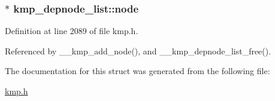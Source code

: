 \hypertarget{structkmp__depnode__list_a8873aa1231cab49fdd5ca6dc3b89eca4}{
\subsubsection[{node}]{$\ast$ kmp\-\_\-depnode\-\_\-list\-::node}}\label{structkmp__depnode__list_a8873aa1231cab49fdd5ca6dc3b89eca4}


Definition at line 2089 of file kmp.\-h.



Referenced by \-\_\-\-\_\-kmp\-\_\-add\-\_\-node(), and \-\_\-\-\_\-kmp\-\_\-depnode\-\_\-list\-\_\-free().



The documentation for this struct was generated from the following file\-:\begin{DoxyCompactItemize}
\item 
\hyperlink{kmp_8h}{kmp.\-h}\end{DoxyCompactItemize}
